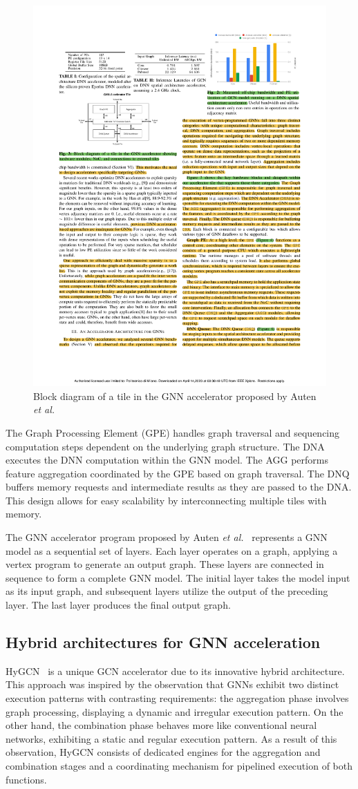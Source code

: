 \begin{figure}[t]
    \centering
    \includegraphics[height=0.3\textwidth]{Images/auten_tile_diagram}
    \caption{Block diagram of a tile in the GNN accelerator proposed by Auten \textit{et al.}~\cite{9218751}}
    \label{fig:auten_tile_diagram}
\end{figure}

The Graph Processing Element (GPE) handles graph traversal and sequencing computation steps dependent on the underlying graph structure.
The DNA executes the DNN computation within the GNN model.
The AGG performs feature aggregation coordinated by the GPE based on graph traversal.
The DNQ buffers memory requests and intermediate results as they are passed to the DNA.
This design allows for easy scalability by interconnecting multiple tiles with memory.

The GNN accelerator program proposed by Auten \textit{et al.}~\cite{9218751} represents a GNN model as a sequential set of layers.
Each layer operates on a graph, applying a vertex program to generate an output graph.
These layers are connected in sequence to form a complete GNN model.
The initial layer takes the model input as its input graph, and subsequent layers utilize the output of the preceding layer.
The last layer produces the final output graph.

\subsection{Hybrid architectures for GNN acceleration}
\label{subsec:hybrid-architectures}%

HyGCN~\cite{DBLP:journals/corr/abs-2001-02514} is a unique GCN accelerator due to its innovative hybrid architecture.
This approach was inspired by the observation that GNNs exhibit two distinct execution patterns with contrasting requirements: the aggregation phase involves graph processing, displaying a dynamic and irregular execution pattern.
On the other hand, the combination phase behaves more like conventional neural networks, exhibiting a static and regular execution pattern.
As a result of this observation, HyGCN consists of dedicated engines for the aggregation and combination stages and a coordinating mechanism for pipelined execution of both functions.

